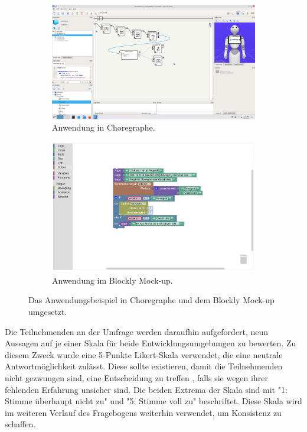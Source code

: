 \begin{figure}[t]
	\centering
	\begin{subfigure}{.5\textwidth}
		\centering
		\includegraphics[width=\linewidth]{Plots/umfrage-choregraphe-anwendung.png}
		\caption{Anwendung in Choregraphe.}
		\label{subfig:choregraphe-anwendung}
	\end{subfigure}%
	\begin{subfigure}{.5\textwidth}
		\centering
		\includegraphics[width=\linewidth]{Plots/umfrage-blockly-anwendung.png}
		\caption{Anwendung im Blockly Mock-up.}
		\label{subfig:blockly-anwendung}
	\end{subfigure}
	\caption{Das Anwendungsbeispiel in Choregraphe und dem Blockly Mock-up umgesetzt.}
	\label{fig:umfrage-anwendung}
\end{figure}

Die Teilnehmenden an der Umfrage werden daraufhin aufgefordert, neun Aussagen auf je einer Skala für beide Entwicklungsumgebungen zu bewerten. Zu diesem Zweck wurde eine 5-Punkte Likert-Skala \cite{Schnell2018MethodenES} verwendet, die eine neutrale Antwortmöglichkeit zulässt. Diese sollte existieren, damit die Teilnehmenden nicht gezwungen sind, eine Entscheidung zu treffen \cite{Willits2016AnotherLookLikert}, falls sie wegen ihrer fehlenden Erfahrung unsicher sind. Die beiden Extrema der Skala sind mit "1: Stimme überhaupt nicht zu" und "5: Stimme voll zu" beschriftet. Diese Skala wird im weiteren Verlauf des Fragebogens weiterhin verwendet, um Konsistenz zu schaffen.

